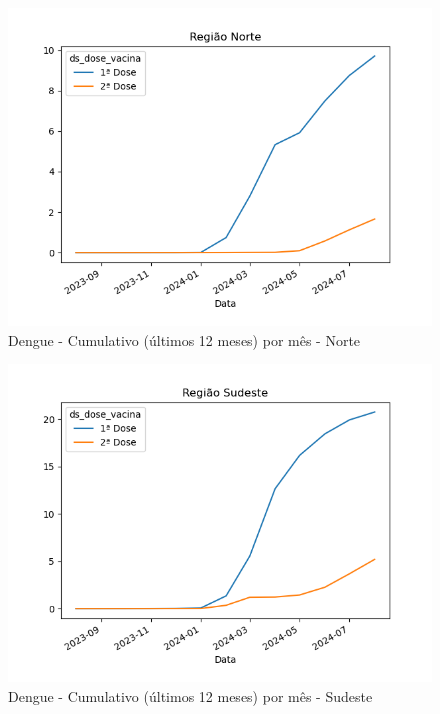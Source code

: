 \documentclass[12pt]{article}
\begin{document}
\begin{figure}[H]
    \centering
    \includegraphics[width=0.85\linewidth]{imagens/Dengue-Norte-Cumulativo-mes}
    \caption{Dengue - Cumulativo (últimos 12 meses) por mês - Norte}
    \label{fig:dengue-norte-cumulativo-mes}
\end{figure}
\begin{figure}[H]
    \centering
    \includegraphics[width=0.85\linewidth]{imagens/Dengue-Sudeste-Cumulativo-mes}
    \caption{Dengue - Cumulativo (últimos 12 meses) por mês - Sudeste}
    \label{fig:dengue-sudeste-cumulativo-mes}
\end{figure}
\end{document}
